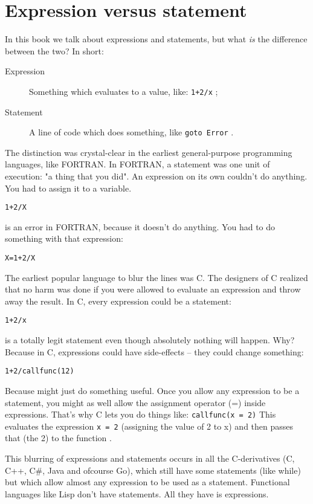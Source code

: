 \section{Expression versus statement}
\label{sec:expression versus statement}
In this book we talk about expressions and statements, but%
what \emph{is} the difference between the two?
In short:
\begin{description}
\item[Expression] Something which evaluates to a value, like:
\lstinline{1+2/x} ;
\item[Statement] A line of code which does something, like
\lstinline{goto Error} .
\end{description}

The distinction was crystal-clear in the earliest general-purpose
programming languages, like FORTRAN. In FORTRAN, a statement was one
unit of execution: "a thing that you did". 
An expression on its own couldn't do anything. You had to assign it to a
variable.
\begin{alltt}
1 + 2 / X
\end{alltt}
\noindent{}is an error in FORTRAN, because it doesn't do anything. You had to do
something with that expression: 
\begin{alltt}{X = 1 + 2 / X}\end{alltt}

The earliest popular language to blur the lines was C. The designers of
C realized that no harm was done if you were allowed to evaluate an
expression and throw away the result. In C, every expression could be a
statement: 
\begin{alltt}1 + 2 / x\end{alltt}
\noindent{}is a totally legit statement even though absolutely nothing will happen.
Why? Because in C, expressions could have side-effects -- they could
change something: \begin{alltt}{1 + 2 / callfunc(12)}\end{alltt}

\noindent{}Because  might just do something useful.
Once you allow any expression to be a statement, you might as well allow
the assignment operator (=) inside expressions. That's why C lets you do
things like: \lstinline{callfunc(x = 2)}
This evaluates the expression \lstinline{x = 2} (assigning the value of 2 to x) and
then passes that (the 2) to the function .

This blurring of expressions and statements occurs in all the
C-derivatives (C, C++, C\#, Java and ofcourse Go), which still have some
statements (like while) but which allow almost any expression to be used
as a statement. Functional languages like Lisp don't have statements.
All they have is expressions. 

